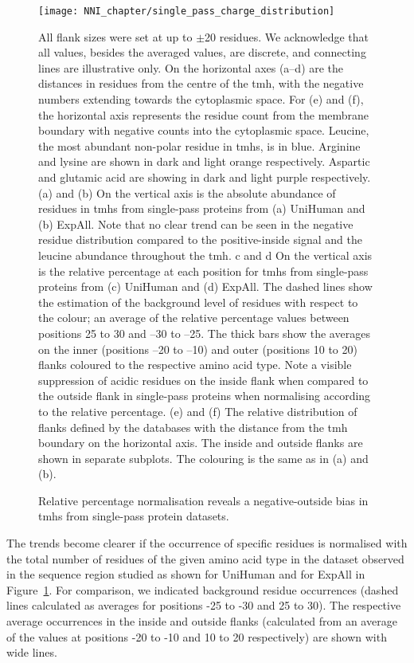 \begin{figure}[p]
\centering
\texttt{[image: NNI\_chapter/single\_pass\_charge\_distribution]}
\caption{ Relative percentage normalisation reveals a negative-outside bias in \gls{tmh}s from single-pass protein datasets.}

\medskip
\scriptsize
\justify

All flank sizes were set at up to $\pm$20 residues. We acknowledge that all values, besides the averaged values, are discrete, and connecting lines are illustrative only. On the horizontal axes (a–d) are the distances in residues from the centre of the \gls{tmh}, with the negative numbers extending towards the cytoplasmic space. For (e) and (f), the horizontal axis represents the residue count from the membrane boundary with negative counts into the cytoplasmic space. Leucine, the most abundant non-polar residue in \gls{tmh}s, is in blue. Arginine and lysine are shown in dark and light orange respectively. Aspartic and glutamic acid are showing in dark and light purple respectively. (a) and (b) On the vertical axis is the absolute abundance of residues in \gls{tmh}s from single-pass proteins from (a) UniHuman and (b) ExpAll. Note that no clear trend can be seen in the negative residue distribution compared to the positive-inside signal and the leucine abundance throughout the \gls{tmh}. c and d On the vertical axis is the relative percentage at each position for \gls{tmh}s from single-pass proteins from (c) UniHuman and (d) ExpAll. The dashed lines show the estimation of the background level of residues with respect to the colour; an average of the relative percentage values between positions 25 to 30 and –30 to –25. The thick bars show the averages on the inner (positions –20 to –10) and outer (positions 10 to 20) flanks coloured to the respective amino acid type. Note a visible suppression of acidic residues on the inside flank when compared to the outside flank in single-pass proteins when normalising according to the relative percentage. (e) and (f) The relative distribution of flanks defined by the databases with the distance from the \gls{tmh} boundary on the horizontal axis. The inside and outside flanks are shown in separate subplots. The colouring is the same as in (a) and (b).
\label{fig:single_pass_charge_distribution}
\end{figure}

The trends become clearer if the occurrence of specific residues is normalised with the total number of residues of the given amino acid type in the dataset observed in the sequence region studied as shown for UniHuman and for ExpAll in Figure~\ref{fig:single_pass_charge_distribution}. For comparison, we indicated background residue occurrences (dashed lines calculated as averages for positions -25 to -30 and 25 to 30). The respective average occurrences in the inside and outside flanks (calculated from an average of the values at positions -20 to -10 and 10 to 20 respectively) are shown with wide lines.

